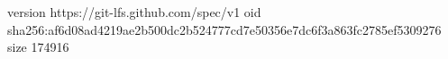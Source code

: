 version https://git-lfs.github.com/spec/v1
oid sha256:af6d08ad4219ae2b500dc2b524777cd7e50356e7dc6f3a863fc2785ef5309276
size 174916
